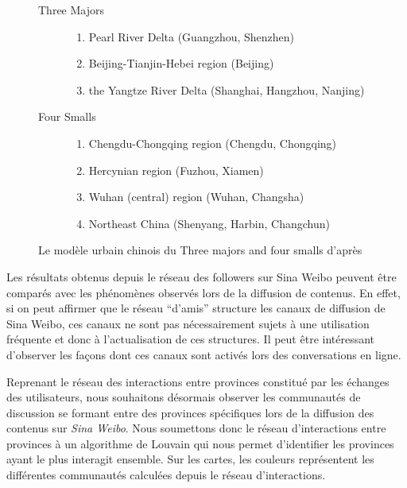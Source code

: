 \begin{figure}[h!]
    \centering
    
    \begin{description}
    \item[Three Majors]
      \begin{enumerate}
      \item Pearl River Delta (Guangzhou, Shenzhen)
      \item Beijing-Tianjin-Hebei region (Beijing)
      \item the Yangtze River Delta (Shanghai, Hangzhou, Nanjing)
      \end{enumerate}

    \item[Four Smalls]
      \begin{enumerate}
      \item Chengdu-Chongqing region (Chengdu, Chongqing)
      \item Hercynian region (Fuzhou, Xiamen)
      \item Wuhan (central) region (Wuhan, Changsha)
      \item Northeast China (Shenyang, Harbin, Changchun)
      \end{enumerate}

    \end{description}

   \caption{
      Le modèle urbain chinois du Three majors and four smalls d{\textquoteright}après \cite{Zhen2013}
    }
\end{figure}

Les résultats obtenus depuis le réseau des followers sur Sina Weibo peuvent être comparés avec les phénomènes observés lors de la diffusion de contenus. En effet, si on peut affirmer que le réseau {\textquotedblleft}d{\textquoteright}amis{\textquotedblright} structure les canaux de diffusion de Sina Weibo, ces canaux ne sont pas nécessairement sujets \`a une utilisation fréquente et donc \`a l{\textquoteright}actualisation de ces structures. Il peut être intéressant d'observer les façons dont ces canaux sont activés lors des conversations en ligne.

Reprenant le réseau des interactions entre provinces constitué par les échanges des utilisateurs, nous souhaitons désormais observer les communautés de discussion se formant entre des provinces spécifiques lors de la diffusion des contenus sur \textit{Sina Weibo}. Nous soumettons donc le réseau d{\textquoteright}interactions entre provinces \`a un algorithme de Louvain \citep{Blondel2008} qui nous permet d'identifier les provinces ayant le plus interagit ensemble. Sur les cartes, les couleurs représentent les différentes communautés calculées depuis le réseau d{\textquoteright}interactions. 

